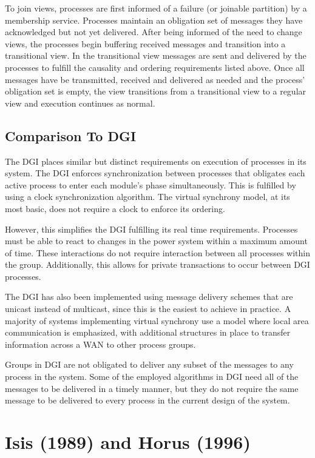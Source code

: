 To join views, processes are first informed of a failure (or joinable partition) by a membership service. Processes maintain an obligation set of messages they have acknowledged but not yet delivered. After being informed of the need to change views, the processes begin buffering received messages and transition into a transitional view. In the transitional view messages are sent and delivered by the processes to fulfill the causality and ordering requirements listed above. Once all messages have be transmitted, received and delivered as needed and the process' obligation set is empty, the view transitions from a transitional view to a regular view and execution continues as normal.

\subsection{Comparison To DGI}

The DGI places similar but distinct requirements on execution of processes in its system. The DGI enforces synchronization between processes that obligates each active process to enter each module's phase simultaneously. This is fulfilled by using a clock synchronization algorithm. The virtual synchrony model, at its most basic, does not require a clock to enforce its ordering.

However, this simplifies the DGI fulfilling its real time requirements.  Processes must be able to react to changes in the power system within a maximum amount of time. These interactions do not require interaction between all processes within the group. Additionally, this allows for private transactions to occur between DGI processes. 

The DGI has also been implemented using message delivery schemes that are unicast instead of multicast, since this is the easiest to achieve in practice. A majority of systems implementing virtual synchrony use a model where local area communication is emphasized, with additional structures in place to transfer information across a WAN to other process groups.

Groups in DGI are not obligated to deliver any subset of the messages to any process in the system. Some of the employed algorithms in DGI need all of the messages to be delivered in a timely manner, but they do not require the same message to be delivered to every process in the current design of the system.

\section{Isis (1989) and Horus (1996)}

